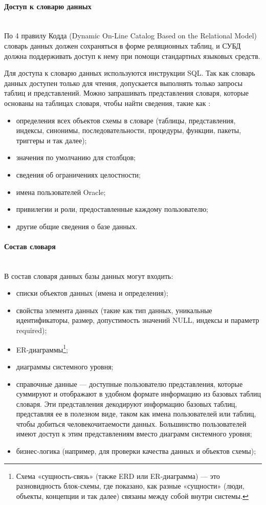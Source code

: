 \paragraph{Доступ к словарю данных} ~\\

По 4 правилу Кодда (Dynamic On-Line Catalog Based on the Relational Model) словарь данных должен сохраняться в форме реляционных
таблиц, и СУБД должна поддерживать доступ к нему при
помощи стандартных языковых средств.

Для доступа к словарю данных используются инструкции SQL. Так как словарь данных доступен только для чтения, допускается выполнять только запросы таблиц и представлений.
Можно запрашивать представления словаря, которые основаны на таблицах словаря, чтобы найти сведения, такие как \autocite{Oracle}:
\begin{itemize}
\item определения всех объектов схемы в словаре (таблицы, представления, индексы, синонимы, последовательности, процедуры, функции, пакеты, триггеры и так далее);
\item значения по умолчанию для столбцов;
\item сведения об ограничениях целостности;
\item имена пользователей Oracle;
\item привилегии и роли, предоставленные каждому пользователю;
\item другие общие сведения о базе данных.
\end{itemize}

\paragraph{Состав словаря} ~\\

В состав словаря данных базы данных могут входить: \autocite{DataDictionary}
\begin{itemize}
\item списки объектов данных (имена и определения);
\item свойства элемента данных (такие как тип данных, уникальные идентификаторы, размер, допустимость значений NULL, индексы и параметр required);
\item ER-диаграммы\footnote{Схема «сущность-связь» (также ERD или ER-диаграмма) — это разновидность блок-схемы, где показано, как разные «сущности» (люди, объекты, концепции и так далее) связаны между собой внутри системы.};
\item диаграммы системного уровня;
\item справочные данные — доступные пользователю представления, которые
суммируют и отображают в удобном формате информацию из базовых таблиц словаря. Эти представления декодируют информацию базовых таблиц, представляя ее в полезном виде, таком как имена пользователей или таблиц, чтобы добиться человекочитаемости данных. Большинство пользователей имеют доступ к этим представлениям вместо диаграмм системного уровня;
\item бизнес-логика (например, для проверки качества данных и объектов схемы);
\end{itemize}

